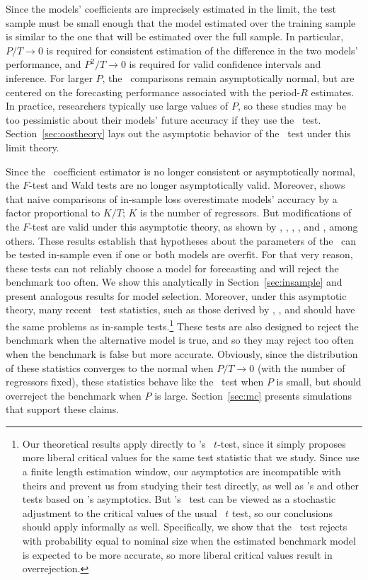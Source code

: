\documentclass[11pt]{article}
\newcommand{\citepos}[1]{\citeauthor{#1}'s \citeyearpar{#1}}
\newcommand{\clws}{\citeauthor{ClW:06}'s \citeyearpar{ClW:06,ClW:07}}
\begin{document}
Since the models' coefficients are imprecisely estimated in the limit,
the test sample must be small enough that the model estimated over the
training sample is similar to the one that will be estimated over the
full sample.  In particular, $P/T \to 0$ is required for consistent
estimation of the difference in the two models' performance,
and $P^2/T \to 0$ is required for valid confidence
intervals and inference.  For larger $P$, the \oos\ comparisons remain
asymptotically normal, but are centered on the forecasting performance
associated with the period-$R$ estimates.  In practice, researchers
typically use large values of $P$, so these studies may be too
pessimistic about their models' future accuracy if they use the \dmw\
test.  Section~\ref{sec:oostheory} lays out the asymptotic behavior of
the \dmw\ test under this limit theory.

Since the \ols\ coefficient estimator is no longer consistent or
asymptotically normal, the $F$-test and Wald tests are no longer
asymptotically valid.  Moreover, \citet{Efr:86,Efr:04} shows that
naive comparisons of in-sample loss overestimate models' accuracy by a
factor proportional to $K/T$; $K$ is the number of regressors.  But
modifications of the $F$-test are valid under this asymptotic theory,
as shown by \citet{BoB:95}, \citet{AkA:00}, \citet{AkP:04},
\citet{Cal:11c}, and \citet{Ana:12}, among others.  These results
establish that hypotheses about the parameters of the \dgp\ can be
tested in-sample even if one or both models are overfit.  For that
very reason, these tests can not reliably choose a model for
forecasting and will reject the benchmark too often.  We show this
analytically in Section~\ref{sec:insample} and present analogous
results for model selection.  Moreover, under this asymptotic theory,
many recent \oos\ test statistics, such as those derived by
\cite{ClM:01,ClM:05}, \citet{Mcc:07}, and \citet{ClW:06,ClW:07} should
have the same problems as in-sample tests.\footnote{Our theoretical
  results apply directly to \citepos{Mcc:07} \oos\ $t$-test, since it
  simply proposes more liberal critical values for the same test
  statistic that we study.  Since \citet{ClW:06,ClW:07} use a finite
  length estimation window, our asymptotics are incompatible with
  theirs and prevent us from studying their test directly, as well as
  \citepos{GiW:06} and other tests based on \citepos{GiW:06}
  asymptotics.  But \clws\ test can be viewed as a stochastic
  adjustment to the critical values of the usual \oos\ $t$ test, so
  our conclusions should apply informally as well.  Specifically, we
  show that the \dmw\ test rejects with probability equal to nominal
  size when the estimated benchmark model is expected to be more
  accurate, so more liberal critical values result in overrejection.}
These tests are also designed to reject the benchmark when the
alternative model is true, and so they may reject too often when the
benchmark is false but more accurate.  Obviously, since the
distribution of these statistics converges to the normal when $P/T \to
0$ (with the number of regressors fixed), these statistics behave like
the \dmw\ test when $P$ is small, but should overreject the benchmark
when $P$ is large.  Section~\ref{sec:mc} presents simulations that
support these claims.
\end{document}
